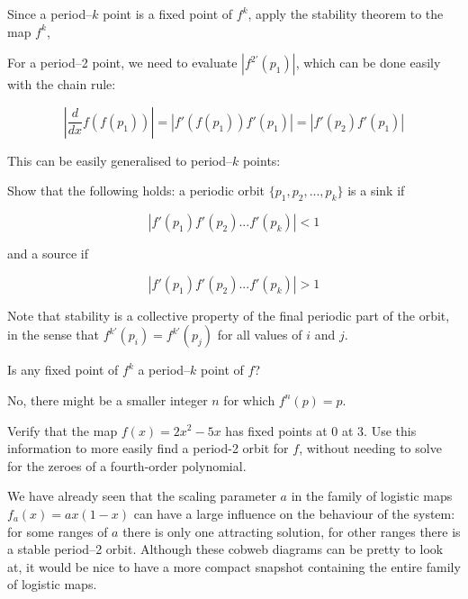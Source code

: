\begin{cue}
Since a period--$k$ point is a fixed point of $f^k$, apply the stability theorem to the map $f^k$,
\end{cue}

For a period--2 point, we need to evaluate $|f^{2'}(p_1)|$, which can be done easily with the chain rule:

\begin{equation}
\left|\frac{d}{dx} f(f(p_1))\right| = |f'(f(p_1)) f'(p_1)| = |f'(p_2) f'(p_1)|
\end{equation}  

This can be easily generalised to period--$k$ points:

\begin{exer}
Show that the following holds: a periodic orbit $\{p_1, p_2, ..., p_k\}$ is a sink if

$$|f'(p_1) f'(p_2) ... f'(p_k)| < 1$$

and a source if

$$|f'(p_1) f'(p_2) ... f'(p_k)| > 1$$

\end{exer}

Note that stability is a collective property of the final periodic part of the orbit, in the sense that $f^{k'}(p_i) = f^{k'}(p_j)$ for all values of $i$ and $j$.

\begin{exer}
Is any fixed point of $f^k$ a period--$k$ point of $f$?
\begin{sol}
No, there might be a smaller integer $n$ for which $f^n(p)=p$.  
\end{sol}
\end{exer}

\begin{exer}
Verify that the map $f(x)=2x^2-5x$ has fixed points at 0 at 3. Use this information to more easily find a period-2 orbit for $f$, without needing to solve for the zeroes of a fourth-order polynomial.
\end{exer}


\pagebreak


We have already seen that the scaling parameter $a$ in the family of logistic maps $f_a(x)=ax(1-x)$ can have a large influence on the behaviour of the system: for some ranges of $a$ there is only one attracting solution, for other ranges there is a stable period--2 orbit. Although these cobweb diagrams can be pretty to look at, it would be nice to have a more compact snapshot containing the entire family of logistic maps.


